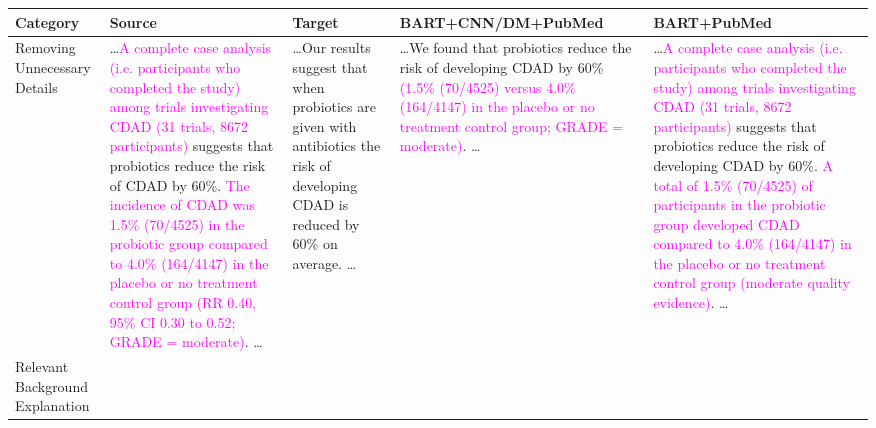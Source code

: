 \documentclass[letterpaper, table]{article} %
\begin{document}


\begin{table*}[t!]
\centering
\tiny
\begin{tabular}{@{}m{1.4cm}<{\centering}m{3.55cm}<{\centering}m{3.55cm}<{\centering}m{3.55cm}<{\centering}m{3.55cm}<{\centering} @{}}
\toprule
\textbf{Category}  & \textbf{Source}   & \textbf{Target}  & \textbf{BART+CNN/DM+PubMed} & \textbf{BART+PubMed}  \\ \midrule
Removing Unnecessary Details
& \ldots \textcolor{magenta}{A complete case analysis (i.e. participants who completed the study) among trials investigating CDAD (31 trials, 8672 participants)} suggests that probiotics reduce the risk of CDAD by 60\%. \textcolor{magenta}{The incidence of CDAD was 1.5\% (70/4525) in the probiotic group compared to 4.0\% (164/4147) in the placebo or no treatment control group (RR 0.40, 95\% CI 0.30 to 0.52; GRADE = moderate)}. \ldots \cite{goldenberg2017probiotics}
& \ldots Our results suggest that when probiotics are given with antibiotics the risk of developing CDAD is reduced by 60\% on average. \ldots
& \ldots We found that probiotics reduce the risk of developing CDAD by 60\% \textcolor{magenta}{(1.5\% (70/4525) versus 4.0\% (164/4147) in the placebo or no treatment control group; GRADE = moderate)}. \ldots
& \ldots \textcolor{magenta}{A complete case analysis (i.e. participants who completed the study) among trials investigating CDAD (31 trials, 8672 participants)} suggests that probiotics reduce the risk of developing CDAD by 60\%. \textcolor{magenta}{A total of 1.5\% (70/4525) of participants in the probiotic group developed CDAD compared to 4.0\% (164/4147) in the placebo or no treatment control group (moderate quality evidence)}. \ldots
\\ \midrule
Relevant Background Explanation

\end{tabular}
\end{table*}
\end{document}
